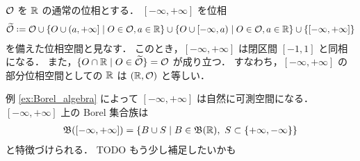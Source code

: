 \begin{example}
    $\mathcal{O}$ を $\mathbb{R}$ の通常の位相とする．
    $[-\infty,+\infty]$ を位相
    \begin{align}
        \widetilde\Ocal
        \defeq\Ocal
        \cup\{O\cup(a,+\infty]\mid O\in\Ocal, a\in\Rbb\}
        \cup\{O\cup[-\infty,a)\mid O\in\Ocal, a\in\Rbb\}
        \cup\{[-\infty,+\infty]\}
        \label{eqn:extended_real_topology}
    \end{align}
    を備えた位相空間と見なす．
    このとき，$[-\infty,+\infty]$ は閉区間 $[-1,1]$ と同相になる．
    また，$\{O\cap\mathbb{R}\mid O\in\widetilde{\mathcal{O}}\}=\mathcal{O}$ が成り立つ．
    すなわち，$[-\infty,+\infty]$ の部分位相空間としての $\mathbb{R}$ は $(\mathbb{R},\mathcal{O})$ と等しい．

    例 \ref{ex:Borel_algebra} によって $[-\infty,+\infty]$ は自然に可測空間になる．
    $[-\infty,+\infty]$ 上の Borel 集合族は
    \begin{align*}
        \mathfrak{B}([-\infty,+\infty])
        =\{B\cup S\mid B\in\mathfrak{B}(\mathbb{R}),\ S\subset\{+\infty,-\infty\}\}
    \end{align*}
    と特徴づけられる．
    {\color{red} TODO もう少し補足したいかも}
\end{example}
